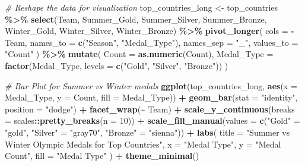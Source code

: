 \documentclass[
]{article}
\newenvironment{Shaded}{\begin{snugshade}}{\end{snugshade}}
\newcommand{\AttributeTok}[1]{\textcolor[rgb]{0.13,0.29,0.53}{#1}}
\newcommand{\CommentTok}[1]{\textcolor[rgb]{0.56,0.35,0.01}{\textit{#1}}}
\newcommand{\DecValTok}[1]{\textcolor[rgb]{0.00,0.00,0.81}{#1}}
\newcommand{\FunctionTok}[1]{\textcolor[rgb]{0.13,0.29,0.53}{\textbf{#1}}}
\newcommand{\NormalTok}[1]{#1}
\newcommand{\OtherTok}[1]{\textcolor[rgb]{0.56,0.35,0.01}{#1}}
\newcommand{\SpecialCharTok}[1]{\textcolor[rgb]{0.81,0.36,0.00}{\textbf{#1}}}
\newcommand{\StringTok}[1]{\textcolor[rgb]{0.31,0.60,0.02}{#1}}
\begin{document}
\begin{Shaded}
\begin{Highlighting}[]
\CommentTok{\# Reshape the data for visualization}
\NormalTok{top\_countries\_long }\OtherTok{\textless{}{-}}\NormalTok{ top\_countries }\SpecialCharTok{\%\textgreater{}\%}
  \FunctionTok{select}\NormalTok{(Team, Summer\_Gold, Summer\_Silver, Summer\_Bronze, Winter\_Gold, Winter\_Silver, Winter\_Bronze) }\SpecialCharTok{\%\textgreater{}\%}
  \FunctionTok{pivot\_longer}\NormalTok{(}
    \AttributeTok{cols =} \SpecialCharTok{{-}}\NormalTok{Team,}
    \AttributeTok{names\_to =} \FunctionTok{c}\NormalTok{(}\StringTok{"Season"}\NormalTok{, }\StringTok{"Medal\_Type"}\NormalTok{),}
    \AttributeTok{names\_sep =} \StringTok{"\_"}\NormalTok{, }
    \AttributeTok{values\_to =} \StringTok{"Count"}
\NormalTok{  ) }\SpecialCharTok{\%\textgreater{}\%}
  \FunctionTok{mutate}\NormalTok{(}
    \AttributeTok{Count =} \FunctionTok{as.numeric}\NormalTok{(Count), }
    \AttributeTok{Medal\_Type =} \FunctionTok{factor}\NormalTok{(Medal\_Type, }\AttributeTok{levels =} \FunctionTok{c}\NormalTok{(}\StringTok{"Gold"}\NormalTok{, }\StringTok{"Silver"}\NormalTok{, }\StringTok{"Bronze"}\NormalTok{)) }
\NormalTok{  )}

\CommentTok{\# Bar Plot for Summer vs Winter medals}
\FunctionTok{ggplot}\NormalTok{(top\_countries\_long, }\FunctionTok{aes}\NormalTok{(}\AttributeTok{x =}\NormalTok{ Medal\_Type, }\AttributeTok{y =}\NormalTok{ Count, }\AttributeTok{fill =}\NormalTok{ Medal\_Type)) }\SpecialCharTok{+}
  \FunctionTok{geom\_bar}\NormalTok{(}\AttributeTok{stat =} \StringTok{"identity"}\NormalTok{, }\AttributeTok{position =} \StringTok{"dodge"}\NormalTok{) }\SpecialCharTok{+}
  \FunctionTok{facet\_wrap}\NormalTok{(}\SpecialCharTok{\textasciitilde{}}\NormalTok{ Team) }\SpecialCharTok{+} 
  \FunctionTok{scale\_y\_continuous}\NormalTok{(}\AttributeTok{breaks =}\NormalTok{ scales}\SpecialCharTok{::}\FunctionTok{pretty\_breaks}\NormalTok{(}\AttributeTok{n =} \DecValTok{10}\NormalTok{)) }\SpecialCharTok{+} 
  \FunctionTok{scale\_fill\_manual}\NormalTok{(}\AttributeTok{values =} \FunctionTok{c}\NormalTok{(}\StringTok{"Gold"} \OtherTok{=} \StringTok{"gold"}\NormalTok{, }\StringTok{"Silver"} \OtherTok{=} \StringTok{"gray70"}\NormalTok{, }\StringTok{"Bronze"} \OtherTok{=} \StringTok{"sienna"}\NormalTok{)) }\SpecialCharTok{+} 
  \FunctionTok{labs}\NormalTok{(}
    \AttributeTok{title =} \StringTok{"Summer vs Winter Olympic Medals for Top Countries"}\NormalTok{,}
    \AttributeTok{x =} \StringTok{"Medal Type"}\NormalTok{,}
    \AttributeTok{y =} \StringTok{"Medal Count"}\NormalTok{,}
    \AttributeTok{fill =} \StringTok{"Medal Type"}
\NormalTok{  ) }\SpecialCharTok{+}
  \FunctionTok{theme\_minimal}\NormalTok{()}
\end{Highlighting}
\end{Shaded}
\end{document}
